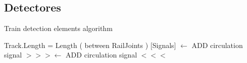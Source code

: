 \subsection{Detectores}

\lipsum[1]

\begin{algorithm}[hbt!]
            \caption{Train detection elements algorithm}\label{alg:RJ}
            \DontPrintSemicolon
            \SetNoFillComment
            \LinesNotNumbered 
            {
                Track.Length = Length ( between RailJoints )\;
                {
                    [Signals] $\gets$ ADD circulation signal $>>>$\;
                    [Signals] $\gets$ ADD circulation signal $<<<$\;
                }
            }
            \KwResult{[Signals]} 
        \end{algorithm} 